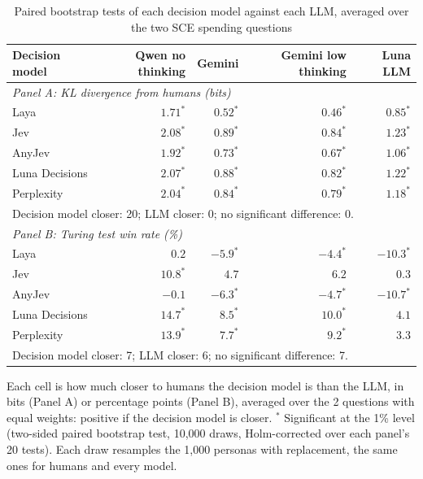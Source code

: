 \begin{table}[htbp]
\centering
\caption{Paired bootstrap tests of each decision model against each LLM, averaged over the two SCE spending questions}
\label{tab:sce_bootstrap}
\begin{tabular}{lrrrr}
\toprule
Decision model & Qwen no thinking & Gemini & Gemini low thinking & Luna LLM \\
\midrule
\multicolumn{5}{l}{\textit{Panel A: KL divergence from humans (bits)}} \\
\midrule
Laya & $1.71^{*}$ & $0.52^{*}$ & $0.46^{*}$ & $0.85^{*}$ \\
Jev & $2.08^{*}$ & $0.89^{*}$ & $0.84^{*}$ & $1.23^{*}$ \\
AnyJev & $1.92^{*}$ & $0.73^{*}$ & $0.67^{*}$ & $1.06^{*}$ \\
Luna Decisions & $2.07^{*}$ & $0.88^{*}$ & $0.82^{*}$ & $1.22^{*}$ \\
Perplexity & $2.04^{*}$ & $0.84^{*}$ & $0.79^{*}$ & $1.18^{*}$ \\
\multicolumn{5}{l}{\footnotesize Decision model closer: 20; LLM closer: 0; no significant difference: 0.} \\
\midrule
\multicolumn{5}{l}{\textit{Panel B: Turing test win rate (\%)}} \\
\midrule
Laya & $0.2$ & $-5.9^{*}$ & $-4.4^{*}$ & $-10.3^{*}$ \\
Jev & $10.8^{*}$ & $4.7$ & $6.2$ & $0.3$ \\
AnyJev & $-0.1$ & $-6.3^{*}$ & $-4.7^{*}$ & $-10.7^{*}$ \\
Luna Decisions & $14.7^{*}$ & $8.5^{*}$ & $10.0^{*}$ & $4.1$ \\
Perplexity & $13.9^{*}$ & $7.7^{*}$ & $9.2^{*}$ & $3.3$ \\
\multicolumn{5}{l}{\footnotesize Decision model closer: 7; LLM closer: 6; no significant difference: 7.} \\
\bottomrule
\end{tabular}
\par\smallskip
\parbox{\linewidth}{\footnotesize Each cell is how much closer to humans the decision model is than the LLM, in bits (Panel A) or percentage points (Panel B), averaged over the 2 questions with equal weights: positive if the decision model is closer. $^{*}$ Significant at the 1\% level (two-sided paired bootstrap test, 10,000 draws, Holm-corrected over each panel's 20 tests). Each draw resamples the 1,000 personas with replacement, the same ones for humans and every model.}
\end{table}
